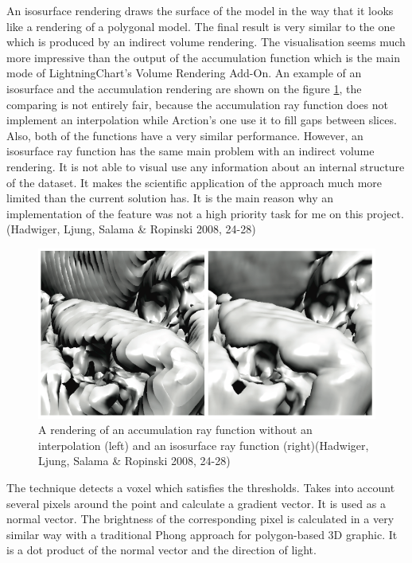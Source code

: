 \documentclass[twoside, english, 11pt]{report}
\begin{document}
An isosurface rendering draws the surface of the model in the way that it looks like a rendering of a polygonal model. The final result is very similar to the one which is produced by an indirect volume rendering. The visualisation seems much more impressive than the output of the accumulation function which is the main mode of LightningChart's Volume Rendering Add-On. An example of an isosurface and the accumulation rendering are shown on the figure \ref{fig:iso}, the comparing is not entirely fair, because the accumulation ray function does not implement an interpolation while Arction's one use it to fill gaps between slices. Also, both of the functions have a very similar performance. However, an isosurface ray function has the same main problem with an indirect volume rendering. It is not able to visual use any information about an internal structure of the dataset. It makes the scientific application of the approach much more limited than the current solution has. It is the main reason why an implementation of the feature was not a high priority task for me on this project.(Hadwiger, Ljung, Salama \& Ropinski 2008, 24-28)
\begin{figure}[H]
\centerline{\includegraphics[scale = 0.5]{img/iso}}
\caption{A rendering of an accumulation ray function without an interpolation (left) and an isosurface ray function (right)(Hadwiger, Ljung, Salama \& Ropinski 2008, 24-28)\label{fig:iso}}
\end{figure}

The technique detects a voxel which satisfies the thresholds. Takes into account several pixels around the point and calculate a gradient vector. It is used as a normal vector. The brightness of the corresponding pixel is calculated in a very similar way with a traditional Phong approach for polygon-based 3D graphic. It is a dot product of the normal vector and the direction of light.\\
\end{document}
